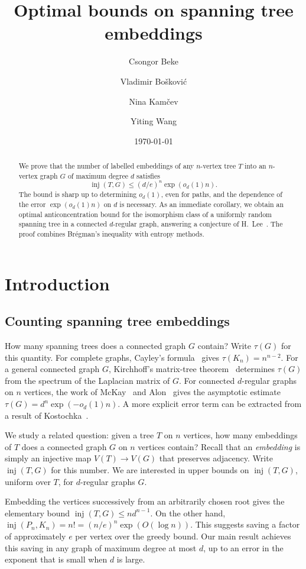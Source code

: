 \documentclass[reqno,final,a4paper]{amsart}
\title{Optimal bounds on spanning tree embeddings}
\author{Csongor Beke}\address{(C. Beke) University of Cambridge}\email{cb2138@cam.ac.uk}
\author{Vladimir Bo\v{s}kovi\'c}\address{(V. Bo\v{s}kovi\'c) Alfr\'ed R\'enyi Institute of Mathematics}\email{boskovic@renyi.hu}
\author{Nina Kam\v{c}ev}\address{(N. Kam\v{c}ev) Faculty of Science, University of Zagreb}\email{nina.kamcev@math.hr}
\author{Yiting Wang}\address{(Y. Wang) Institute of Science and Technology Austria}\email{yiting.wang@ist.ac.at}
\date{\today}
\numberwithin{equation}{section}
\theoremstyle{definition}
\theoremstyle{remark}
\DeclareMathOperator{\inj}{inj}
\begin{document}
\begin{abstract}
We prove that the number of labelled embeddings of any $n$-vertex tree $T$ into an $n$-vertex graph $G$ of maximum degree $d$ satisfies
\[
    \inj(T,G) \leq (d/e)^n \exp(o_d(1)n).
\]
The bound is sharp up to determining $o_d(1)$, even for paths, and the dependence of the error $\exp(o_d(1)n)$ on $d$ is necessary.
As an immediate corollary, we obtain an optimal anticoncentration bound for the isomorphism class of a uniformly random spanning tree in a connected $d$-regular graph, answering a conjecture of H.~Lee~\cite{Lee}. The proof combines Br\'egman's inequality with entropy methods.
\end{abstract}

\maketitle

\section{Introduction}

\subsection{Counting spanning tree embeddings}
How many spanning trees does a connected graph $G$ contain? Write $\tau(G)$ for this quantity.
For complete graphs, Cayley's formula~\cite{Cayley} gives $\tau(K_n)=n^{n-2}$. 
For a general connected graph $G$, Kirchhoff's matrix-tree theorem~\cite{kirchhoff1847ueber} determines $\tau(G)$ from the spectrum of the Laplacian matrix of $G$.
For connected $d$-regular graphs on $n$ vertices, the work of McKay~\cite{McKay} and Alon~\cite{Alon} gives the asymptotic estimate $\tau(G)=d^n\exp(-o_d(1)n)$. A more explicit error term can be extracted from a result of Kostochka~\cite{kostochka1995number}.

We study a related question: given a tree $T$ on $n$ vertices, how many embeddings of $T$ does a connected graph $G$ on $n$ vertices contain? Recall that an \emph{embedding} is simply an injective map $V(T)\rightarrow V(G)$ that preserves adjacency. Write $\inj(T,G)$ for this number. 
We are interested in upper bounds on $\inj(T,G)$, uniform over $T$, for $d$-regular graphs $G$.

Embedding the vertices successively from an arbitrarily chosen root gives the elementary bound $\inj(T,G)\leq nd^{n-1}$. On the other hand, $\inj(P_n,K_n)=n!=(n/e)^n\exp(O(\log n))$. This suggests saving a factor of approximately $e$ per vertex over the greedy bound. Our main result achieves this saving in any graph of maximum degree at most $d$, up to an error in the exponent that is small when $d$ is large.
\end{document}
